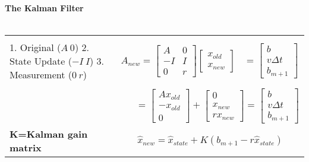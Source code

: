 \documentclass{article}
\begin{document}
\begin{axiom}
  \textbf{The Kalman Filter}\\ \\
  \begin{tabular}{|m{4.5cm}|m{6cm}}
    \hline \\
    \parbox[t]{5cm}{
      1. Original ($A~0$)             \\
      2. State Update ($-I~I$)        \\
      3. Measurement ($0~r$)
    }&
    \parbox[t]{6cm}{
      $A_{new}=
        \begin{bmatrix}
          A  & 0 \\
          -I & I \\
          0  & r
        \end{bmatrix}
        \begin{bmatrix}
          x_{old} \\
          x_{new}
        \end{bmatrix}~~~~=
        \begin{bmatrix}
          b         \\
          v\Delta t \\
          b_{m+1}
        \end{bmatrix}$
    }                               \\ \\
    &
    $~~~~~~~=\begin{bmatrix}
      Ax_{old}\\
      -x_{old}\\
      0
    \end{bmatrix}+
    \begin{bmatrix}
      0\\
      x_{new}\\
      rx_{new}
    \end{bmatrix}=
    \begin{bmatrix}
      b\\
      v\Delta t\\
      b_{m+1}
    \end{bmatrix}$
    \\
    \hline
    \textbf{K=Kalman gain matrix} &
    \begin{equation}
      \label{eq:kalman_update}
      \hat{x}_{new}=\hat{x}_{state}+K(b_{m+1}-r\hat{x}_{state})
    \end{equation}
    \\
    \hline
  \end{tabular}
  \\ \\

\end{axiom}
\end{document}
